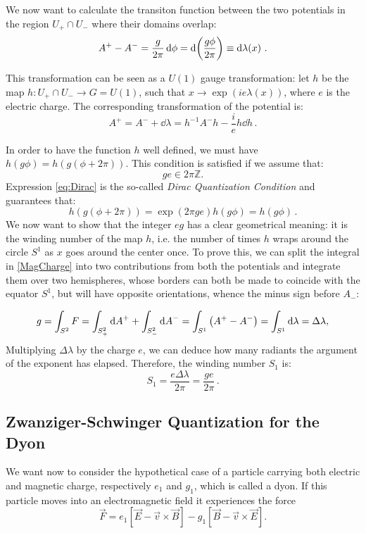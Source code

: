 \documentclass[main.tex]{subfiles}
\begin{document}
\medskip
We now want to calculate the transiton function between the two potentials in the region $U_+ \cap U_-$ where their domains overlap:
\begin{equation}
A^+-A^-=\frac{g}{2\pi}\dd{\phi}=\dd{\qty(\frac{g\phi}{2\pi})} \equiv \dd{\lambda(x)}\,.
\end{equation}

This transformation can be seen as a $U(1)$ gauge transformation:
let $h$ be the map $h:U_+\cap U_- \to G=U(1)$, such that $x\to \exp(ie\lambda(x))$, where $e$ is the electric charge.
The corresponding transformation of the potential is:
%
\begin{equation}
A^+=A^-+\dd{\lambda}=h^{-1}A^-h-\frac{i}{e}h \dd{h}\,.
\end{equation}

In order to have  the function $h$ well defined, we must have $h(g\phi) = h(g(\phi+ 2\pi))$.
This condition is satisfied if we assume that: 
\begin{equation}
ge \in 2\pi\mathbb{Z}.
\label{eq:Dirac}
\end{equation}
Expression  \eqref{eq:Dirac} is the so-called \textit{Dirac Quantization Condition} and guarantees that: 
\begin{equation}
h(g(\phi + 2\pi)) =  \exp(2 \pi ge)  h(g\phi) = h( g \phi) \,.
\end{equation}
We now want to show that the integer $eg$ has a clear geometrical meaning: it is the winding number of the map $h$, i.e. the number of times $h$ wraps around the circle $S^1$ as $x$ goes around the center once.
To prove this, we can split the integral in \eqref{MagCharge} into two contributions from both the potentials and integrate them over two hemispheres, whose borders can both be made to coincide with the equator $S^1$, but will have opposite orientations, whence the minus sign before $A_-$:

\begin{equation}
g=\int_{S^2}F=\int_{S^2_+}\dd{A}^++\int_{S^2_-}\dd{A}^-=\int_{S^1}\qty(A^+-A^-)=\int_{S^1}\dd{\lambda}=\Delta\lambda,
\end{equation}
%
Multiplying $\Delta \lambda$ by the charge $e$, we can deduce how many radiants the argument of the exponent has elapsed. Therefore, the winding number $S_1$ is: 
\begin{equation}
S_1=\frac{e\Delta\lambda}{2\pi}=\frac{ge}{2\pi} \,.
\end{equation}


\subsection{Zwanziger-Schwinger Quantization for the Dyon}
We want now to consider the hypothetical case of a particle carrying both electric and magnetic charge, respectively $e_1$ and $g_1$, which is called a dyon. If this particle moves into an electromagnetic field it experiences the force
\begin{equation}
\vec F=e_1\left[\vec E-\vec v\times\vec B\right]-g_1\left[\vec B-\vec v\times\vec E\right].
\end{equation}
\end{document}
